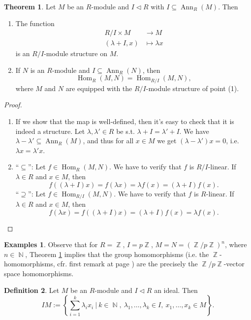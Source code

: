 \documentclass[12pt,a4paper]{report}
\theoremstyle{definition}
\newtheorem{theorem}{Theorem}[chapter] %
\newtheorem{defn}[theorem]{Definition}
\newtheorem*{examples}{Examples}
\theoremstyle{num.custom-title}
\DeclareMathOperator{\Hom}{Hom}
\DeclareMathOperator{\Ann}{Ann}
\DeclareMathOperator{\N}{\mathbb{N}}
\DeclareMathOperator{\Z}{\mathbb{Z}}
\DeclareMathOperator{\sse}{\subseteq}
\begin{document}
\begin{theorem}\label{thm-equiv-hom}
Let $M$ be an $R$-module and $I \lhd R$ with $I \sse \Ann_R(M)$. Then
\begin{enumerate}
\item The function
\begin{align*}
R/I \times M &\to M \\
(\lambda + I, x) &\mapsto \lambda x
\end{align*}
is an $R/I$-module structure on $M$.
\item If $N$ is an $R$-module and $I \sse \Ann_R(N)$, then
\[
\Hom_R(M,N) = \Hom_{R/I}(M,N),
\]
where $M$ and $N$ are equipped with the $R/I$-module structure of point (1).
\end{enumerate}
\begin{proof}\ 
\begin{enumerate}
\item If we show that the map is well-defined, then it's easy to check that it is indeed a structure. Let $\lambda,\lambda' \in R$ be s.t. $\lambda + I = \lambda' + I$. We have $\lambda - \lambda' \sse \Ann_R(M)$, and thus for all $x \in M$ we get $(\lambda-\lambda')x=0$, i.e. $\lambda x = \lambda' x$.
\item ``$\sse$'': Let $f \in \Hom_R(M,N)$. We have to verify that $f$ is $R/I$-linear. If $\lambda \in R$ and $x \in M$, then
\[
f((\lambda + I)x) = f(\lambda x) = \lambda f(x) = (\lambda + I) f(x).
\]
``$\supseteq$'': Let $f \in \Hom_{R/I}(M,N)$. We have to verify that $f$ is $R$-linear. If $\lambda \in R$ and $x \in M$, then
\[
f(\lambda x) = f((\lambda + I)x) = (\lambda + I) f(x) = \lambda f(x).
\]
\end{enumerate}
\end{proof}
\end{theorem}

\begin{examples}
Observe that for $R=\Z$, $I=p\Z$, $M=N=(\Z/p\Z)^n$, where $n \in \N$, Theorem \ref{thm-equiv-hom} implies that the group homomorphisms (i.e. the $\Z$-homomorphisms, cfr. first remark at page \pageref{Z-hom=goup_hom}) are the precisely the $\Z/p\Z$-vector space homomorphisms.
\end{examples}

\begin{defn}
Let $M$ be an $R$-module and $I \lhd R$ an ideal. Then
\[
IM := \left\{ \sum_{i=1}^k \lambda_i x_i \ \Bigg| \ k \in \N, \ \lambda_1,\ldots,\lambda_k \in I, \ x_1,\ldots,x_k \in M \right\}.
\]
\end{defn}
\end{document}
